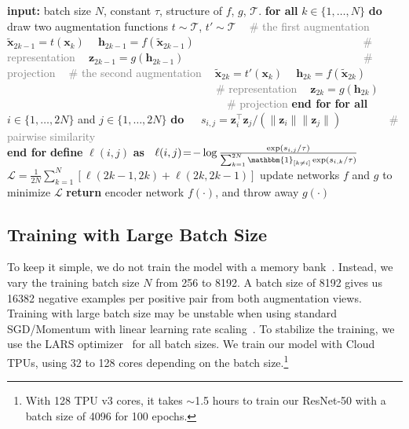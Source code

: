 \begin{algorithm}[!t]
\caption{\label{alg:main} SimCLR's main learning algorithm.}
\begin{algorithmic}
    \STATE \textbf{input:} batch size $N$, constant $\tau$, structure of $f$, $g$, $\mathcal{T}$.
    \STATE \textbf{for all} $k\in \{1, \ldots, N\}$ \textbf{do}
        \STATE $~~~~$draw two augmentation functions $t \!\sim\! \mathcal{T}$, $t' \!\sim\! \mathcal{T}$
        \STATE $~~~~$\textcolor{gray}{\# the first augmentation} \STATE $~~~~$$\tilde{\bm x}_{2k-1} = t(\bm x_k)$
        \STATE $~~~~$$\bm h_{2k-1} = f(\tilde{\bm x}_{2k-1})$  \textcolor{gray}{~~~~~~~~~~~~~~~~~~~~~~~~~~~~~~\# representation}
        \STATE $~~~~$$\bm z_{2k-1} = g({\bm h}_{2k-1})$  \textcolor{gray}{~~~~~~~~~~~~~~~~~~~~~~~~~~~~~~~~\# projection}
        \STATE $~~~~$\textcolor{gray}{\# the second augmentation} \STATE $~~~~$$\tilde{\bm x}_{2k} = t'(\bm x_k)$
        \STATE $~~~~$$\bm h_{2k} = f(\tilde{\bm x}_{2k})$      \textcolor{gray}{~~~~~~~~~~~~~~~~~~~~~~~~~~~~~~~~~~~~~~\# representation}
        \STATE $~~~~$$\bm z_{2k} = g({\bm h}_{2k})$      \textcolor{gray}{~~~~~~~~~~~~~~~~~~~~~~~~~~~~~~~~~~~~~~~~\# projection}
    \STATE \textbf{end for}
    \STATE \textbf{for all} $i\in\{1, \ldots, 2N\}$ and $j\in\{1, \dots, 2N\}$ \textbf{do}
    \STATE $~~~~$ $s_{i,j} = \bm z_i^\top \bm z_j / (\lVert\bm z_i\rVert \lVert\bm z_j\rVert)$ \textcolor{gray}{~~~~~~~~\# pairwise similarity}\\
    \STATE \textbf{end for}
    \STATE \textbf{define} $\ell(i, j)$ \textbf{as}~ $\ell(i, j) \!=\! -\log \frac{\exp(s_{i,j}/\tau)}{\sum_{k=1}^{2N} \mathbbm{1}_{[k \neq i]}\exp(s_{i, k}/\tau)}$ \\ \STATE $\mathcal{L} = \frac{1}{2N} \sum_{k=1}^N \left[ \ell(2k\!-\!1, 2k) + \ell(2k, 2k\!-\!1)\right]$
    \STATE update networks $f$ and $g$ to minimize $\mathcal{L}$
    \ENDFOR
    \STATE \textbf{return} encoder network $f(\cdot)$, and throw away $g(\cdot)$
\end{algorithmic}
\end{algorithm}

\subsection{Training with Large Batch Size} To keep it simple, we do not train the model with a memory bank~\cite{wu2018unsupervised,he2019momentum}. Instead, we vary the training batch size $N$ from 256 to 8192. A batch size of 8192 gives us 16382 negative examples per positive pair from both augmentation views. Training with large batch size may be unstable when using standard SGD/Momentum with linear learning rate scaling~\cite{goyal2017accurate}. To stabilize the training, we use the LARS optimizer~\cite{you2017large} for all batch sizes. We train our model with Cloud TPUs, using 32 to 128 cores depending on the batch size.\footnote{With 128 TPU v3 cores, it takes $\sim$1.5 hours to train our ResNet-50 with a batch size of 4096 for 100 epochs.}

